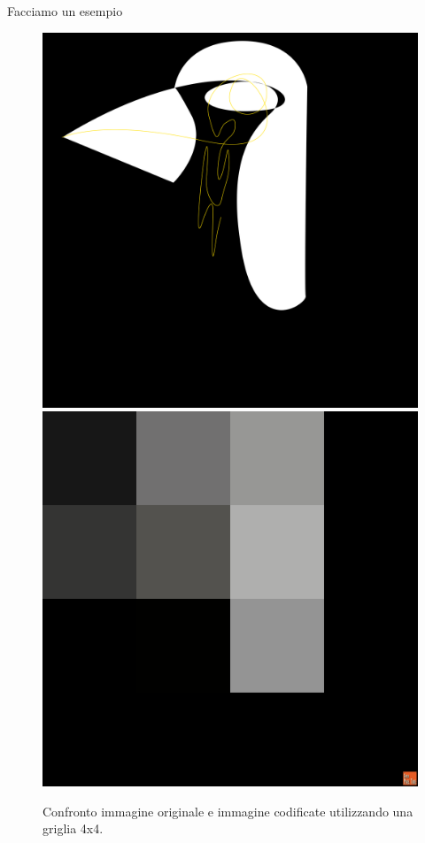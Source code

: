 Facciamo un esempio

\begin{figure}[htb] \centering
\includegraphics[scale=0.03]{Pictures/in ricordo del pinguino cameriere.png}
\qquad\qquad
\includegraphics[scale=0.03]{Pictures/canvas8x8.png}
\caption{Confronto immagine originale e immagine codificate utilizzando una griglia 4x4.}\label{fig:figura}
\end{figure}

